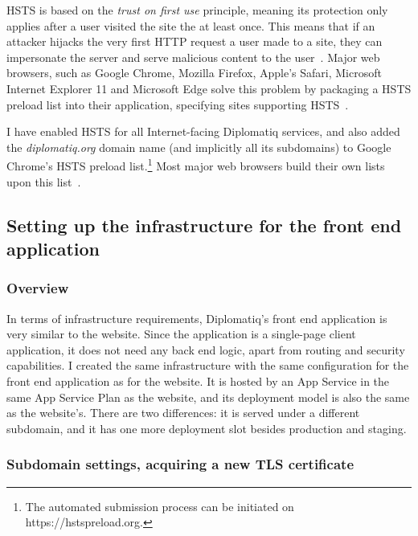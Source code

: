 HSTS is based on the \emph{trust on first use} principle, meaning its protection only applies after a user visited the site the at least once. This means that if an attacker hijacks the very first HTTP request a user made to a site, they can impersonate the server and serve malicious content to the user~\cite{rfc6977}. Major web browsers, such as Google Chrome, Mozilla Firefox, Apple's Safari, Microsoft Internet Explorer 11 and Microsoft Edge solve this problem by packaging a HSTS preload list into their application, specifying sites supporting HSTS~\cite{hstspreload}.

I have enabled HSTS for all Internet-facing Diplomatiq services, and also added the \emph{diplomatiq.org} domain name (and implicitly all its subdomains) to Google Chrome's HSTS preload list.\footnote{The automated submission process can be initiated on https://hstspreload.org.} Most major web browsers build their own lists upon this list~\cite{hstspreload}.

\subsection{Setting up the infrastructure for the front end application}

\subsubsection{Overview}

In terms of infrastructure requirements, Diplomatiq's front end application is very similar to the website. Since the application is a single-page client application, it does not need any back end logic, apart from routing and security capabilities. I created the same infrastructure with the same configuration for the front end application as for the website. It is hosted by an App Service in the same App Service Plan as the website, and its deployment model is also the same as the website's. There are two differences: it is served under a different subdomain, and it has one more deployment slot besides production and staging.

\subsubsection{Subdomain settings, acquiring a new TLS certificate}

